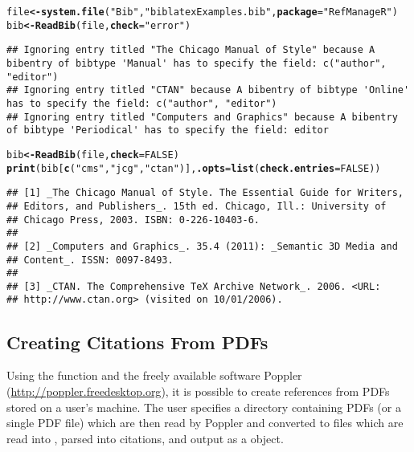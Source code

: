\documentclass[article]{jss}\usepackage[]{graphicx}\usepackage[]{color}
\makeatletter
\newcommand{\hlnum}[1]{\textcolor[rgb]{0.125,0.125,1}{#1}}%
\newcommand{\hlstr}[1]{\textcolor[rgb]{0.125,0.125,1}{#1}}%
\newcommand{\hlstd}[1]{\textcolor[rgb]{0.251,0.251,0.282}{#1}}%
\newcommand{\hlkwb}[1]{\textcolor[rgb]{0.439,0.251,1}{\textbf{#1}}}%
\newcommand{\hlkwc}[1]{\textcolor[rgb]{0.529,0,0.184}{\textbf{#1}}}%
\newcommand{\hlkwd}[1]{\textcolor[rgb]{0.251,0.251,0.282}{\textbf{#1}}}%
\newenvironment{kframe}{%
 \def\at@end@of@kframe{}%
 \ifinner\ifhmode%
  \def\at@end@of@kframe{\end{minipage}}%
  \begin{minipage}{\columnwidth}%
 \fi\fi%
 \def\FrameCommand##1{\hskip\@totalleftmargin \hskip-\fboxsep
 \colorbox{shadecolor}{##1}\hskip-\fboxsep
     \hskip-\linewidth \hskip-\@totalleftmargin \hskip\columnwidth}%
 \MakeFramed {\advance\hsize-\width
   \@totalleftmargin\z@ \linewidth\hsize
   \@setminipage}}%
 {\par\unskip\endMakeFramed%
 \at@end@of@kframe}
\newenvironment{knitrout}{}{} %
\makeatother
\begin{document}
\begin{knitrout}
\color{fgcolor}\begin{kframe}
\begin{alltt}
\hlstd{file} \hlkwb{<-} \hlkwd{system.file}\hlstd{(}\hlstr{"Bib"}\hlstd{,} \hlstr{"biblatexExamples.bib"}\hlstd{,} \hlkwc{package} \hlstd{=} \hlstr{"RefManageR"}\hlstd{)}
\hlstd{bib} \hlkwb{<-} \hlkwd{ReadBib}\hlstd{(file,} \hlkwc{check} \hlstd{=} \hlstr{"error"}\hlstd{)}
\end{alltt}
\begin{lstlisting}
## Ignoring entry titled "The Chicago Manual of Style" because A bibentry of bibtype 'Manual' has to specify the field: c("author", "editor")
## Ignoring entry titled "CTAN" because A bibentry of bibtype 'Online' has to specify the field: c("author", "editor")
## Ignoring entry titled "Computers and Graphics" because A bibentry of bibtype 'Periodical' has to specify the field: editor
\end{lstlisting}\begin{alltt}
\hlstd{bib} \hlkwb{<-} \hlkwd{ReadBib}\hlstd{(file,} \hlkwc{check} \hlstd{=} \hlnum{FALSE}\hlstd{)}
\hlkwd{print}\hlstd{(bib[}\hlkwd{c}\hlstd{(}\hlstr{"cms"}\hlstd{,} \hlstr{"jcg"}\hlstd{,} \hlstr{"ctan"}\hlstd{)],} \hlkwc{.opts} \hlstd{=} \hlkwd{list}\hlstd{(}\hlkwc{check.entries} \hlstd{=} \hlnum{FALSE}\hlstd{))}
\end{alltt}
\begin{verbatim}
## [1] _The Chicago Manual of Style. The Essential Guide for Writers,
## Editors, and Publishers_. 15th ed. Chicago, Ill.: University of
## Chicago Press, 2003. ISBN: 0-226-10403-6.
## 
## [2] _Computers and Graphics_. 35.4 (2011): _Semantic 3D Media and
## Content_. ISSN: 0097-8493.
## 
## [3] _CTAN. The Comprehensive TeX Archive Network_. 2006. <URL:
## http://www.ctan.org> (visited on 10/01/2006).
\end{verbatim}
\end{kframe}
\end{knitrout}


\subsection{Creating Citations From PDFs}
Using the function  and the freely available software Poppler (\url{http://poppler.freedesktop.org}), it is possible to create references from PDFs stored on a user's machine.  The user specifies a directory containing PDFs (or a single PDF file) which are then read by Poppler and converted to  files which are read into \R{}, parsed into citations, and output as a  object.  
\end{document}
